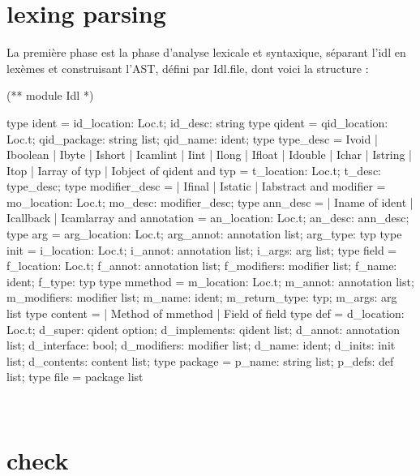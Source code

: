 \documentclass[a4paper, 11pt]{report}
\begin{document}
\section{lexing parsing}
La première phase est la phase d'analyse lexicale et syntaxique,
séparant l'idl en lexèmes et construisant l'AST, défini par Idl.file,
dont voici la structure :
\newpage
\begin{multicols}{2}
\begin{OCaml}
(**  module Idl  *)

type ident = {
    id_location: Loc.t;
    id_desc: string 
  }
type qident = {
    qid_location: Loc.t;
    qid_package: string list;
    qid_name: ident;
  }
type type_desc = 
    Ivoid  
  | Iboolean
  | Ibyte
  | Ishort
  | Icamlint
  | Iint
  | Ilong
  | Ifloat
  | Idouble
  | Ichar
  | Istring
  | Itop
  | Iarray of typ
  | Iobject of qident
and typ = {
    t_location: Loc.t;
    t_desc: type_desc;
  }
type modifier_desc = 
  | Ifinal 
  | Istatic 
  | Iabstract
and modifier = {
    mo_location: Loc.t; 
    mo_desc: modifier_desc;
}
type ann_desc =
  | Iname of ident
  | Icallback
  | Icamlarray
and annotation = {
    an_location: Loc.t; 
    an_desc: ann_desc;
}
type arg = {
    arg_location: Loc.t; 
    arg_annot: annotation list;
    arg_type: typ
}   
type init = {
    i_location: Loc.t;
    i_annot: annotation list; 
    i_args: arg list;
}   
type field = {
    f_location: Loc.t;
    f_annot: annotation list; 
    f_modifiers: modifier list;
    f_name: ident;
    f_type: typ
}
type mmethod = { 
    m_location: Loc.t;
    m_annot: annotation list;
    m_modifiers: modifier list;
    m_name: ident;
    m_return_type: typ;
    m_args: arg list
}
type content = 
    | Method of mmethod 
    | Field of field
type def = {
    d_location: Loc.t;
    d_super: qident option;
    d_implements: qident list;
    d_annot: annotation list;
    d_interface: bool;
    d_modifiers: modifier list;
    d_name: ident;
    d_inits: init list;
    d_contents: content list;
}
type package = {
    p_name: string list;
    p_defs: def list;
}   
type file = package list
 
\end{OCaml}
\end{multicols}
\ 
\newline
\section{check}
\end{document}
